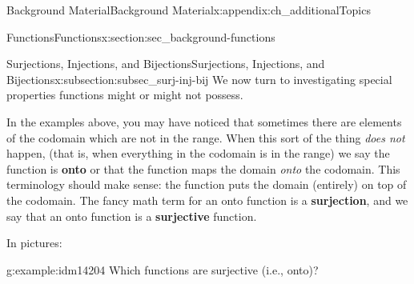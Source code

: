\documentclass[oneside,10pt,]{book}
\newcommand{\terminology}[1]{\textbf{#1}}
\numberwithin{equation}{chapter}
\begin{document}
\begin{appendixptx}{Background Material}{}{Background Material}{}{}{x:appendix:ch_additionalTopics}
\begin{sectionptx}{Functions}{}{Functions}{}{}{x:section:sec_background-functions}
\typeout{************************************************}
%
\begin{subsectionptx}{Surjections, Injections, and Bijections}{}{Surjections, Injections, and Bijections}{}{}{x:subsection:subsec_surj-inj-bij}
We now turn to investigating special properties functions might or might not possess.%
\par
In the examples above, you may have noticed that sometimes there are elements of the codomain which are not in the range. When this sort of the thing \emph{does not} happen, (that is, when everything in the codomain is in the range) we say the function is \terminology{onto} or that the function maps the domain \emph{onto} the codomain. This terminology should make sense: the function puts the domain (entirely) on top of the codomain. The fancy math term for an onto function is a \terminology{surjection}, and we say that an onto function is a \terminology{surjective} function.%
\par
In pictures:%
\begin{sidebyside}{2}{0.1}{0.1}{0.2}%
\begin{sbspanel}{0.3}%
%
\end{sbspanel}%
\begin{sbspanel}{0.3}%
%
\end{sbspanel}%
\end{sidebyside}%
\begin{example}{}{g:example:idm14204}%
Which functions are surjective (i.e., onto)?%

\end{example}
\end{subsectionptx}
\end{sectionptx}
\end{appendixptx}
\end{document}

